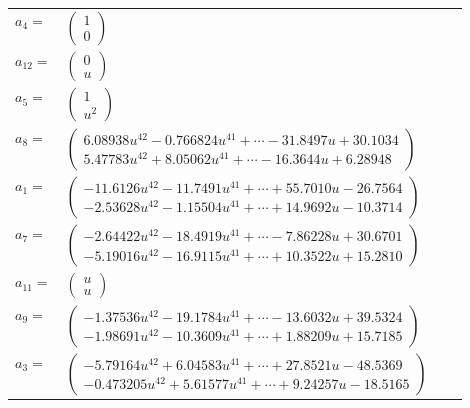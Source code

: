 \documentclass[1p]{elsarticle_modified}
\theoremstyle{definition}
\begin{document}
\begin{tabular}{m{7pt} m{180pt} m{7pt} m{180pt} }
\flushright $a_{4}=$&$\begin{pmatrix}1\\0\end{pmatrix}$ \\
\flushright $a_{12}=$&$\begin{pmatrix}0\\u\end{pmatrix}$ \\
\flushright $a_{5}=$&$\begin{pmatrix}1\\u^2\end{pmatrix}$ \\
\flushright $a_{8}=$&$\begin{pmatrix}6.08938 u^{42}-0.766824 u^{41}+\cdots-31.8497 u+30.1034\\5.47783 u^{42}+8.05062 u^{41}+\cdots-16.3644 u+6.28948\end{pmatrix}$ \\
\flushright $a_{1}=$&$\begin{pmatrix}-11.6126 u^{42}-11.7491 u^{41}+\cdots+55.7010 u-26.7564\\-2.53628 u^{42}-1.15504 u^{41}+\cdots+14.9692 u-10.3714\end{pmatrix}$ \\
\flushright $a_{7}=$&$\begin{pmatrix}-2.64422 u^{42}-18.4919 u^{41}+\cdots-7.86228 u+30.6701\\-5.19016 u^{42}-16.9115 u^{41}+\cdots+10.3522 u+15.2810\end{pmatrix}$ \\
\flushright $a_{11}=$&$\begin{pmatrix}u\\u\end{pmatrix}$ \\
\flushright $a_{9}=$&$\begin{pmatrix}-1.37536 u^{42}-19.1784 u^{41}+\cdots-13.6032 u+39.5324\\-1.98691 u^{42}-10.3609 u^{41}+\cdots+1.88209 u+15.7185\end{pmatrix}$ \\
\flushright $a_{3}=$&$\begin{pmatrix}-5.79164 u^{42}+6.04583 u^{41}+\cdots+27.8521 u-48.5369\\-0.473205 u^{42}+5.61577 u^{41}+\cdots+9.24257 u-18.5165\end{pmatrix}$ \\

\end{tabular}
\end{document}
